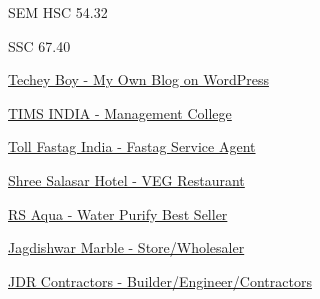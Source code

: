\documentclass[10pt,a4paper,ragged2e,withhyper]{altacv}
\begin{document}
\begin{paracol}{2}
\divider

\item SEM HSC 54.32 %

\divider


\item SSC 67.40 %



\newpage


\href{https://techeyboy.com/}{Techey Boy - My Own Blog on WordPress}

\divider

\href{http://www.timsindia.com/}{TIMS INDIA - Management College}

\divider

\href{https://tollfastag.in/}{Toll Fastag India - Fastag Service Agent}

\divider

\href{https://hotelsalasar.com/}{Shree Salasar Hotel - VEG Restaurant}

\divider

\href{https://rsaqua.in/}{RS Aqua - Water Purify Best Seller}

\divider

\href{https://jagdishwarmarble.com/}{Jagdishwar Marble - Store/Wholesaler}

\divider

\href{https://jdrcontractors.com/}{JDR Contractors - Builder/Engineer/Contractors}

\divider

\switchcolumn




\divider






\end{paracol}
\end{document}
